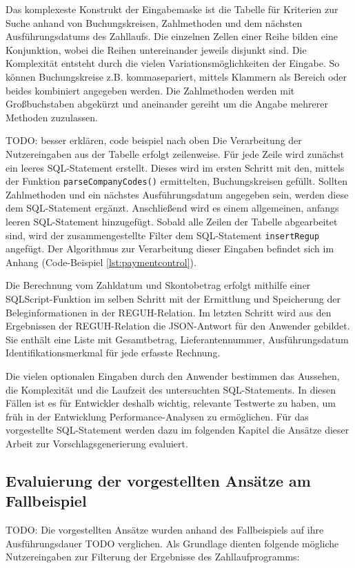 Das komplexeste Konstrukt der Eingabemaske ist die Tabelle für Kriterien zur Suche anhand von Buchungskreisen, Zahlmethoden und dem nächsten Ausführungsdatums des Zahllaufs.
Die einzelnen Zellen einer Reihe bilden eine Konjunktion, wobei die Reihen untereinander jeweils disjunkt sind.
Die Komplexität entsteht durch die vielen Variationsmöglichkeiten der Eingabe.
So können Buchungskreise z.B. kommasepariert, mittels Klammern als Bereich oder beides kombiniert angegeben werden.
Die Zahlmethoden werden mit Großbuchstaben abgekürzt und aneinander gereiht um die Angabe mehrerer Methoden zuzulassen.

TODO: besser erklären, code beispiel nach oben
Die Verarbeitung der Nutzereingaben aus der Tabelle erfolgt zeilenweise.
Für jede Zeile wird zunächst ein leeres SQL-Statement erstellt.
Dieses wird im ersten Schritt mit den, mittels der Funktion \texttt{parseCompanyCodes()} ermittelten, Buchungskreisen gefüllt.
Sollten Zahlmethoden und ein nächstes Ausführungsdatum angegeben sein, werden diese dem SQL-Statement ergänzt.
Anschließend wird es einem allgemeinen, anfangs leeren SQL-Statement hinzugefügt.
Sobald alle Zeilen der Tabelle abgearbeitet sind, wird der zusammengestellte Filter dem SQL-Statement \texttt{insertRegup} angefügt.
Der Algorithmus zur Verarbeitung dieser Eingaben befindet sich im Anhang (Code-Beispiel \ref{lst:paymentcontrol}).

Die Berechnung vom Zahldatum und Skontobetrag erfolgt mithilfe einer SQLScript-Funktion im selben Schritt mit der Ermittlung und Speicherung der Beleginformationen in der REGUH-Relation.
Im letzten Schritt wird aus den Ergebnissen der REGUH-Relation die JSON-Antwort für den Anwender gebildet.
Sie enthält eine Liste mit Gesamtbetrag, Lieferantennummer, Ausführungsdatum Identifikationsmerkmal für jede erfasste Rechnung.

Die vielen optionalen Eingaben durch den Anwender bestimmen das Aussehen, die Komplexität und die Laufzeit des untersuchten SQL-Statements.
In diesen Fällen ist es für Entwickler deshalb wichtig, relevante Testwerte zu haben, um früh in der Entwicklung Performance-Analysen zu ermöglichen.
Für das vorgestellte SQL-Statement werden dazu im folgenden Kapitel die Ansätze dieser Arbeit zur Vorschlagsgenerierung evaluiert.

\subsection{Evaluierung der vorgestellten Ansätze am Fallbeispiel}
TODO: Die vorgestellten Ansätze wurden anhand des Fallbeispiels auf ihre Ausführungsdauer TODO verglichen.
Als Grundlage dienten folgende mögliche Nutzereingaben zur Filterung der Ergebnisse des Zahllaufprogramms:

